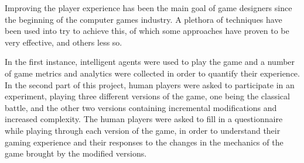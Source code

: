 Improving the player experience has been the main goal of game designers since the beginning of the computer games industry. A plethora of techniques have been used into try to achieve this, of which some approaches have proven to be very effective, and others less so.

In the first instance, intelligent agents were used to play the game and a number of game metrics and analytics were collected in order to quantify their experience. In the second part of this project, human players were asked to participate in an experiment, playing three different versions of the game, one being the classical battle, and the other two versions containing incremental modifications and increased complexity. The human players were asked to fill in a questionnaire while playing through each version of the game, in order to understand their gaming experience and their responses to the changes in the mechanics of the game brought by the modified versions.
